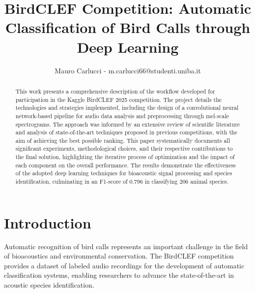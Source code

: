 \documentclass[ERTS, 2025]{ERTS}
\begin{document}
\title{BirdCLEF Competition: Automatic Classification of Bird Calls through Deep Learning}

\author{%
    Mauro Carlucci - m.carlucci66@studenti.uniba.it\authorNumber
}

\address{%
}

\maketitle

\chead{\thetitle}

\pagestyle{fancy}

\thispagestyle{plain}


\begin{abstract}
This work presents a comprehensive description of the workflow developed for participation in the Kaggle BirdCLEF 2025 competition. The project details the technologies and strategies implemented, including the design of a convolutional neural network-based pipeline for audio data analysis and preprocessing through mel-scale spectrograms. The approach was informed by an extensive review of scientific literature and analysis of state-of-the-art techniques proposed in previous competitions, with the aim of achieving the best possible ranking. This paper systematically documents all significant experiments, methodological choices, and their respective contributions to the final solution, highlighting the iterative process of optimization and the impact of each component on the overall performance. The results demonstrate the effectiveness of the adopted deep learning techniques for bioacoustic signal processing and species identification, culminating in an F1-score of 0.796 in classifying 206 animal species.
\end{abstract}

\section{Introduction}
Automatic recognition of bird calls represents an important challenge in the field of bioacoustics and environmental conservation. The BirdCLEF competition provides a dataset of labeled audio recordings for the development of automatic classification systems, enabling researchers to advance the state-of-the-art in acoustic species identification.
\end{document}
